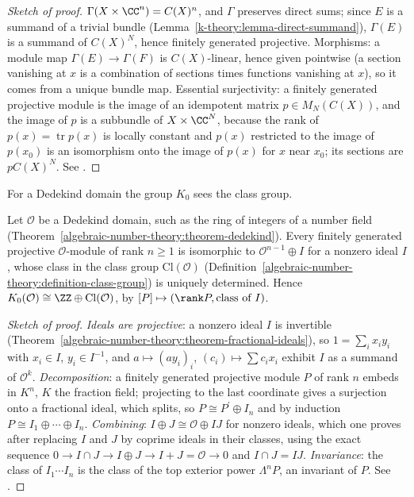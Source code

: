 \begin{proof}[Sketch of proof]
$\Gamma(X \times \CC^n) = C(X)^n$, and $\Gamma$ preserves direct sums; since $E$ is a summand of a trivial bundle (Lemma~\ref{k-theory:lemma-direct-summand}), $\Gamma(E)$ is a summand of $C(X)^N$, hence finitely generated
projective. Morphisms: a module map $\Gamma(E) \to \Gamma(F)$ is $C(X)$-linear, hence given pointwise (a section vanishing at $x$ is a combination of sections times functions vanishing at $x$), so it comes from a
unique bundle map. Essential surjectivity: a finitely generated projective module is the image of an idempotent matrix $p \in M_N(C(X))$, and the image of $p$ is a subbundle of $X \times \CC^N$, because the rank
of $p(x) = \operatorname{tr}p(x)$ is locally constant and $p(x)$ restricted to the image of $p(x_0)$ is an isomorphism onto the image of $p(x)$ for $x$ near $x_0$; its sections are $pC(X)^N$. See
\cite{swan-1962}.
\end{proof}

For a Dedekind domain the group $K_0$ sees the class group.

\begin{theorem}[Steinitz]\label{k-theory:theorem-steinitz}
Let $\mathcal{O}$ be a Dedekind domain, such as the ring of integers of a number field (Theorem~\ref{algebraic-number-theory:theorem-dedekind}). Every finitely generated projective $\mathcal{O}$-module of rank
$n \geq 1$ is isomorphic to $\mathcal{O}^{n-1} \oplus I$ for a nonzero ideal $I$, whose class in the class group $\mathrm{Cl}(\mathcal{O})$ (Definition~\ref{algebraic-number-theory:definition-class-group}) is
uniquely determined. Hence $K_0(\mathcal{O}) \cong \ZZ \oplus \mathrm{Cl}(\mathcal{O})$, by $[P] \mapsto (\rank P, \text{class of } I)$.
\end{theorem}

\begin{proof}[Sketch of proof]
\emph{Ideals are projective}: a nonzero ideal $I$ is invertible (Theorem~\ref{algebraic-number-theory:theorem-fractional-ideals}), so $1 = \sum_ix_iy_i$ with $x_i \in I$, $y_i \in I^{-1}$, and
$a \mapsto (ay_i)_i$, $(c_i) \mapsto \sum c_ix_i$ exhibit $I$ as a summand of $\mathcal{O}^k$. \emph{Decomposition}: a finitely generated projective module $P$ of rank $n$ embeds in $K^n$, $K$ the fraction field; projecting to
the last coordinate gives a surjection onto a fractional ideal, which splits, so $P \cong P^{\prime} \oplus I_n$ and by induction $P \cong I_1 \oplus \cdots \oplus I_n$. \emph{Combining}: $I \oplus J \cong \mathcal{O} \oplus IJ$
for nonzero ideals, which one proves after replacing $I$ and $J$ by coprime ideals in their classes, using the exact sequence $0 \to I \cap J \to I \oplus J \to I + J = \mathcal{O} \to 0$ and $I \cap J = IJ$.
\emph{Invariance}: the class of $I_1\cdots I_n$ is the class of the top exterior power $\Lambda^nP$, an invariant of $P$. See \cite[Chapter 1]{milnor-algebraic-k-theory}.
\end{proof}

